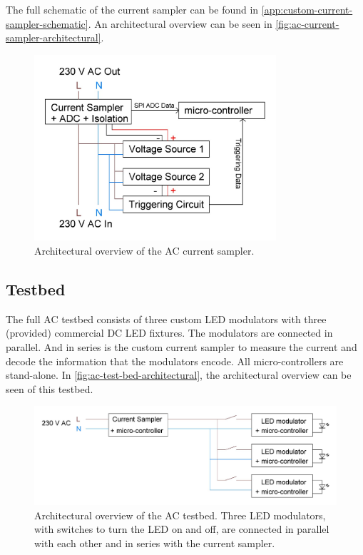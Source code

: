 The full schematic of the current sampler can be found in \autoref{app:custom-current-sampler-schematic}.
An architectural overview can be seen in \autoref{fig:ac-current-sampler-architectural}.

\begin{figure}[htb]
	\centering
	\includegraphics[angle=0,width=0.8\textwidth,keepaspectratio]{chapters/hardware-chapters/ac-current-sampler-architectural.JPG}
	\caption{Architectural overview of the AC current sampler.}
	\label{fig:ac-current-sampler-architectural}
\end{figure}





\subsection{Testbed}
\label{subsec:ac-testbed}

The full AC testbed consists of three custom LED modulators with three (provided) commercial DC LED fixtures.
The modulators are connected in parallel. 
And in series is the custom current sampler to measure the current and decode the information that the modulators encode.
All micro-controllers are stand-alone.
In \autoref{fig:ac-test-bed-architectural}, the architectural overview can be seen of this testbed.

\begin{figure}[htb]
	\centering
	\includegraphics[angle=0,width=\textwidth,keepaspectratio]{chapters/hardware-chapters/ac-test-bed-architectural.JPG}
	\caption{Architectural overview of the AC testbed. Three LED modulators, with switches to turn the LED on and off, are connected in parallel with each other and in series with the current sampler.}
	\label{fig:ac-test-bed-architectural}
\end{figure}



